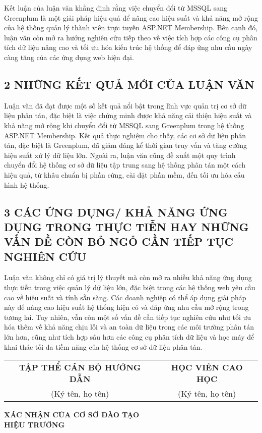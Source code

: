 Kết luận của luận văn khẳng định rằng việc chuyển đổi từ MSSQL sang Greenplum là một giải pháp hiệu quả để nâng cao hiệu suất và khả năng mở rộng của hệ thống quản lý thành viên trực tuyến ASP.NET Membership. Bên cạnh đó, luận văn còn mở ra hướng nghiên cứu tiếp theo về việc tích hợp các công cụ phân tích dữ liệu nâng cao và tối ưu hóa kiến trúc hệ thống để đáp ứng nhu cầu ngày càng tăng của các ứng dụng web hiện đại.


\subsection*{2 NHỮNG KẾT QUẢ MỚI CỦA LUẬN VĂN}
Luận văn đã đạt được một số kết quả nổi bật trong lĩnh vực quản trị cơ sở dữ liệu phân tán, đặc biệt là việc chứng minh được khả năng cải thiện hiệu suất và khả năng mở rộng khi chuyển đổi từ MSSQL sang Greenplum trong hệ thống ASP.NET Membership. Kết quả thực nghiệm cho thấy, các cơ sở dữ liệu phân tán, đặc biệt là Greenplum, đã giảm đáng kể thời gian truy vấn và tăng cường hiệu suất xử lý dữ liệu lớn. Ngoài ra, luận văn cũng đề xuất một quy trình chuyển đổi hệ thống cơ sở dữ liệu tập trung sang hệ thống phân tán một cách hiệu quả, từ khâu chuẩn bị phần cứng, cài đặt phần mềm, đến tối ưu hóa cấu hình hệ thống.


\subsection*{3 CÁC ỨNG DỤNG/ KHẢ NĂNG ỨNG DỤNG TRONG THỰC TIỄN
HAY NHỮNG VẤN ĐỀ CÒN BỎ NGỎ CẦN TIẾP TỤC NGHIÊN CỨU}

Luận văn không chỉ có giá trị lý thuyết mà còn mở ra nhiều khả năng ứng dụng thực tiễn trong việc quản lý dữ liệu lớn, đặc biệt trong các hệ thống web yêu cầu cao về hiệu suất và tính sẵn sàng. Các doanh nghiệp có thể áp dụng giải pháp này để nâng cao hiệu suất hệ thống hiện có và đáp ứng nhu cầu mở rộng trong tương lai. Tuy nhiên, vẫn còn một số vấn đề cần tiếp tục nghiên cứu như tối ưu hóa thêm về khả năng chịu lỗi và an toàn dữ liệu trong các môi trường phân tán lớn hơn, cũng như tích hợp sâu hơn các công cụ phân tích dữ liệu và học máy để khai thác tối đa tiềm năng của hệ thống cơ sở dữ liệu phân tán.

\begin{center}
    \begin{tabular}{c c}
        \textbf{TẬP THỂ CÁN BỘ HƯỚNG DẪN} & \textbf{HỌC VIÊN CAO HỌC} \\
        (Ký tên, họ tên) & (Ký tên, họ tên) \\
    \end{tabular}
    
    \vspace{3cm} %
    
    \textbf{XÁC NHẬN CỦA CƠ SỞ ĐÀO TẠO} \\
    \textbf{HIỆU TRƯỞNG}
\end{center}
